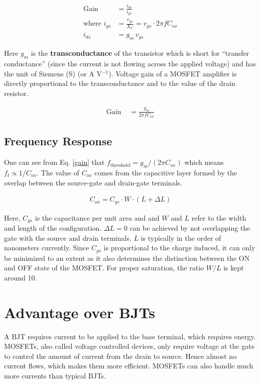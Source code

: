 \begin{align*}
    \text{Gain } &= \frac{i_{ds}}{i_{gs}}\\
    \text{where } i_{gs} &= \frac{v_{gs}}{X_C} = v_{gs}\cdot 2\pi f C_{ox}\\
    i_{ds} &= g_m\,v_{gs}
\end{align*}

Here $g_m$ is the \textbf{transconductance} of the transistor which is short for “transfer conductance” (since the current is not flowing across the applied voltage) and has the unit of Siemens (S) (or A V$^{-1}$). Voltage gain of a MOSFET amplifier is directly proportional to the transconductance and to the value of the drain resistor.

\begin{align}
    \text{Gain } &= \frac{g_m}{2 \pi f C_{ox}} \label{gain}
\end{align}

\subsection*{Frequency Response}
One can see from Eq. \ref{gain} that $f_\text{threshold}=g_m/(2\pi C_{ox})$ which means $f_t \propto 1/C_{ox}$. 
The value of $C_{ox}$ comes from the capacitive layer formed by the overlap between the source-gate and drain-gate terminals.

\begin{align*}
    C_{ox} = C_{gs} \cdot W \cdot (L+\Delta L)
\end{align*}

Here, $C_{gs}$ is the capacitance per unit area and and $W$ and $L$ refer to the width and length of the configuration. $\Delta L = 0$ can be achieved by not overlapping the gate with the source and drain terminals. $L$ is typically in the order of nanometers currently. Since $C_{gs}$ is proportional to the charge induced, it can only be minimized to an extent as it also determines the distinction between the ON and OFF state of the MOSFET. For proper saturation, the ratio $W/L$ is kept around 10.

\section*{Advantage over BJTs}
A BJT requires current to be applied to the base terminal, which requires energy.
MOSFETs, also called voltage controlled devices, only require voltage at the gate to control the amount of current from the drain to source. Hence almost no current flows, which makes them more efficient. MOSFETs can also handle much more currents than typical BJTs.\\

